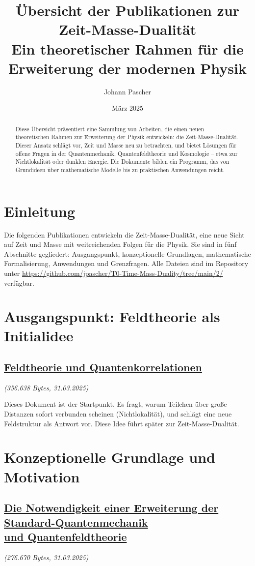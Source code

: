 \documentclass[a4paper,12pt]{article}
\title{Übersicht der Publikationen zur Zeit-Masse-Dualität \\ \Large{Ein theoretischer Rahmen für die Erweiterung der modernen Physik}}
\author{Johann Pascher}
\date{März 2025}
\newcommand{\repobase}{https://github.com/jpascher/T0-Time-Mass-Duality/tree/main/2/}
\begin{document}
	
	\maketitle
	
	\begin{abstract}
		Diese Übersicht präsentiert eine Sammlung von Arbeiten, die einen neuen theoretischen Rahmen zur Erweiterung der Physik entwickeln: die Zeit-Masse-Dualität. Dieser Ansatz schlägt vor, Zeit und Masse neu zu betrachten, und bietet Lösungen für offene Fragen in der Quantenmechanik, Quantenfeldtheorie und Kosmologie – etwa zur Nichtlokalität oder dunklen Energie. Die Dokumente bilden ein Programm, das von Grundideen über mathematische Modelle bis zu praktischen Anwendungen reicht.
	\end{abstract}
	
	\section{Einleitung}
	Die folgenden Publikationen entwickeln die Zeit-Masse-Dualität, eine neue Sicht auf Zeit und Masse mit weitreichenden Folgen für die Physik. Sie sind in fünf Abschnitte gegliedert: Ausgangspunkt, konzeptionelle Grundlagen, mathematische Formalisierung, Anwendungen und Grenzfragen. Alle Dateien sind im Repository unter \url{\repobase} verfügbar.
	
	\section{Ausgangspunkt: Feldtheorie als Initialidee}
	
	\subsection{\small\href{\repobase/pdf/Deutsch/Feldtheorie und Quantenkorrelationen.pdf}{Feldtheorie und Quantenkorrelationen}}
	\textit{(356.638 Bytes, 31.03.2025)}
	
	Dieses Dokument ist der Startpunkt. Es fragt, warum Teilchen über große Distanzen sofort verbunden scheinen (Nichtlokalität), und schlägt eine neue Feldstruktur als Antwort vor. Diese Idee führt später zur Zeit-Masse-Dualität.
	
	\section{Konzeptionelle Grundlage und Motivation}
	
	\subsection{\small\href{\repobase/pdf/Deutsch/Die Notwendigkeit einer Erweiterung der Standard-Quantenmechanik und Quantenfeldtheorie.pdf}{Die Notwendigkeit einer Erweiterung der Standard-Quantenmechanik \\ und Quantenfeldtheorie}}
	\textit{(276.670 Bytes, 31.03.2025)}
	
\end{document}

